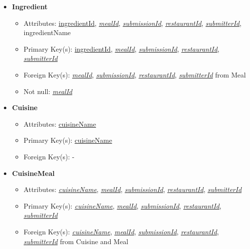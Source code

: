 \documentclass{article}
\begin{document}
\begin{itemize}
        \item \textbf{Ingredient}
        \begin{itemize}
            \item Attributes: \underline{ingredientId}, \underline{\textit{mealId}}, \underline{\textit{submissionId}}, \underline{\textit{restaurantId}}, \underline{\textit{submitterId}}, ingredientName
            \item Primary Key(s): \underline{ingredientId}, \underline{\textit{mealId}}, \underline{\textit{submissionId}}, \underline{\textit{restaurantId}}, \underline{\textit{submitterId}} 
            \item Foreign Key(s): \underline{\textit{mealId}}, \underline{\textit{submissionId}}, \underline{\textit{restaurantId}}, \underline{\textit{submitterId}} from Meal
            \item Not null: \underline{\textit{mealId}}
        \end{itemize}

        \item \textbf{Cuisine}
        \begin{itemize}
            \item Attributes: \underline{cuisineName}
            \item Primary Key(s): \underline{cuisineName}
            \item Foreign Key(s): -
        \end{itemize}

        \item \textbf{CuisineMeal}
        \begin{itemize}
            \item Attributes: \underline{\textit{cuisineName}}, \underline{\textit{mealId}}, \underline{\textit{submissionId}}, \underline{\textit{restaurantId}}, \underline{\textit{submitterId}}
            \item Primary Key(s): \underline{\textit{cuisineName}}, \underline{\textit{mealId}}, \underline{\textit{submissionId}}, \underline{\textit{restaurantId}}, \underline{\textit{submitterId}}
            \item Foreign Key(s): \underline{\textit{cuisineName}}, \underline{\textit{mealId}}, \underline{\textit{submissionId}}, \underline{\textit{restaurantId}}, \underline{\textit{submitterId}} from Cuisine and Meal
        \end{itemize}


\end{itemize}
\end{document}
